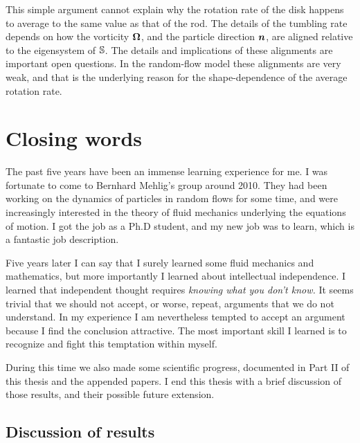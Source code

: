 \documentclass[thesis.tex]{subfiles}
\begin{document}
This simple argument cannot explain why the rotation rate of the disk happens to average to the same value as that of the rod. The details of the tumbling rate depends on how the vorticity $\mbox{\boldmath$\Omega$}$, and the particle direction $\mbox{\boldmath$n$}$, are aligned relative to the eigensystem of $\mathbb{S}$. The details and implications of these alignments are important open questions. In the random-flow model these alignments are very weak, and that is the underlying reason for the shape-dependence of the average rotation rate.

\chapter{Closing words}

The past five years have been an immense learning experience for me. I was fortunate to come to Bernhard Mehlig's group around 2010. They had been working on the dynamics of particles in random flows for some time, and were increasingly interested in the theory of fluid mechanics underlying the equations of motion. I got the job as a Ph.D student, and my new job was to learn, which is a fantastic job description.

Five years later I can say that I surely learned some fluid mechanics and mathematics, but more importantly I learned about intellectual independence. I learned that independent thought requires \emph{knowing what you don't know.} It seems trivial that we should not accept, or worse, repeat, arguments that we do not understand. In my experience I am nevertheless tempted to accept an argument because I find the conclusion attractive. The most important skill I learned is to recognize and fight this temptation within myself.

During this time we also made some scientific progress, documented in Part II of this thesis and the appended papers. I end this thesis with a brief discussion of those results, and their possible future extension.

\section{Discussion of results}
\end{document}
